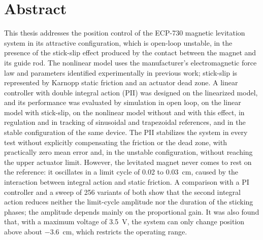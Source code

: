\chapter*{Abstract}\label{Chap:Abstract}

This thesis addresses the position control of the ECP-730 magnetic levitation system in its attractive configuration, which is open-loop unstable, in the presence of the stick-slip effect produced by the contact between the magnet and its guide rod. The nonlinear model uses the manufacturer's electromagnetic force law and parameters identified experimentally in previous work; stick-slip is represented by Karnopp static friction and an actuator dead zone. A linear controller with double integral action (PII) was designed on the linearized model, and its performance was evaluated by simulation in open loop, on the linear model with stick-slip, on the nonlinear model without and with this effect, in regulation and in tracking of sinusoidal and trapezoidal references, and in the stable configuration of the same device. The PII stabilizes the system in every test without explicitly compensating the friction or the dead zone, with practically zero mean error and, in the unstable configuration, without reaching the upper actuator limit. However, the levitated magnet never comes to rest on the reference: it oscillates in a limit cycle of 0.02 to 0.03~cm, caused by the interaction between integral action and static friction. A comparison with a PI controller and a sweep of 256 variants of both show that the second integral action reduces neither the limit-cycle amplitude nor the duration of the sticking phases; the amplitude depends mainly on the proportional gain. It was also found that, with a maximum voltage of 3.5~V, the system can only change position above about $-3.6$~cm, which restricts the operating range.
